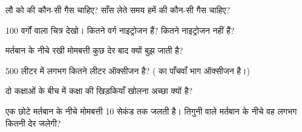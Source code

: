 \begin{exercise}[$\star$]\label{exo:g4:air-a-mixture-of-gases:6}
लौ को  की कौन-सी गैस चाहिए? साँस लेते समय हमें  की कौन-सी गैस
चाहिए?
\end{exercise}

\begin{exercise}[$\star$]\label{exo:g4:air-a-mixture-of-gases:7}
100 वर्गों वाला चित्र देखो। कितने वर्ग नाइट्रोजन हैं? कितने
नाइट्रोजन नहीं हैं?
\end{exercise}

\begin{exercise}[$\star$]\label{exo:g4:air-a-mixture-of-gases:8}
मर्तबान के नीचे रखी मोमबत्ती कुछ देर बाद क्यों बुझ जाती है?
\end{exercise}

\begin{exercise}[$\star$]\label{exo:g4:air-a-mixture-of-gases:9}
500 लीटर  में लगभग कितने लीटर ऑक्सीजन है? ( का पाँचवाँ भाग
ऑक्सीजन है।)
\end{exercise}

\begin{exercise}[$\star\star$]\label{exo:g4:air-a-mixture-of-gases:10}
दो कक्षाओं के बीच में कक्षा की खिड़कियाँ खोलना अच्छा क्यों है?
\end{exercise}

\begin{exercise}[$\star\star$]\label{exo:g4:air-a-mixture-of-gases:11}
एक छोटे मर्तबान के नीचे मोमबत्ती 10 सेकंड तक जलती है। तिगुनी  वाले
मर्तबान के नीचे वह लगभग कितनी देर जलेगी?
\end{exercise}

